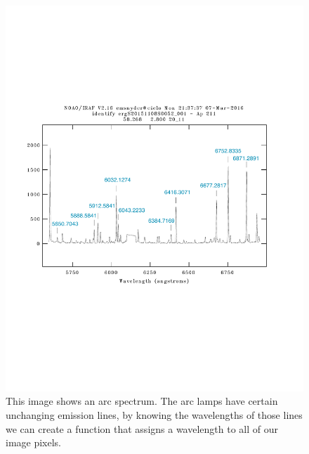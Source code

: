 \documentclass[12pt]{report}
\begin{document}
\begin{figure}[h]
\centering
\includegraphics[scale=0.6]{wavelength_example_new}
\caption[Example of the wavelength solution]{This image shows an arc spectrum. The arc lamps have certain unchanging emission lines, by knowing the wavelengths of those lines we can create a function that assigns a wavelength to all of our image pixels.}
\label{fig:wave}
\end{figure}
\end{document}
